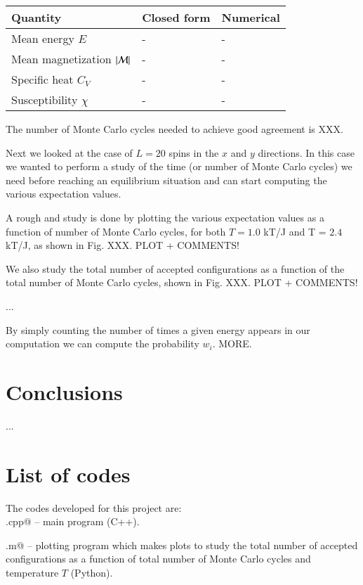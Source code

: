 \documentclass{article}
\begin{document}
\begin{multicols}{2}
\begin{center}
\begin{tabular}{ l l l }\hline
	Quantity 								& Closed form	 				& Numerical		\\ \hline
	Mean energy $E$ 						& - 							& -		 \\
	Mean magnetization $|{\cal M}|$ 			& -							& -		 \\
	Specific heat $C_V$						& -							& - 		\\
	Susceptibility $\chi$						& -							& -		\\
	\hline
\end{tabular}
\end{center}
The number of Monte Carlo cycles needed to achieve good agreement is XXX.

Next we looked at the case of $L = 20$ spins in the $x$ and $y$ directions. In this case we wanted to perform a study of the time (or number of Monte Carlo cycles) we need before reaching an equilibrium situation and can start computing the various expectation values. 

A rough and study is done by plotting the various expectation values as a function of number of Monte Carlo cycles, for both $T = 1.0$ kT/J and T = $2.4$ kT/J, as shown in Fig. XXX. PLOT + COMMENTS!

We also study the total number of accepted configurations as a function of the total number of Monte Carlo cycles, shown in Fig. XXX. PLOT + COMMENTS! 

...

By simply counting the number of times a given energy appears in our computation we can compute the probability $w_i$. MORE. 




\section{Conclusions}

...





\section{List of codes}

The codes developed for this project are:\\

\noindent \verb@main.cpp@ -- main program (C++).

\noindent \verb@plotting.m@ -- plotting program which makes plots to study the total number of accepted configurations as a function of total number of Monte Carlo cycles and temperature $T$ (Python).

\end{multicols}
\end{document}
